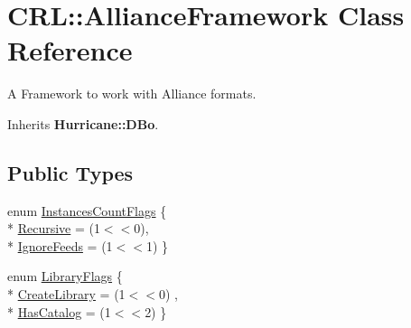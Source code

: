 \hypertarget{classCRL_1_1AllianceFramework}{\section{C\-R\-L\-:\-:Alliance\-Framework Class Reference}
\label{classCRL_1_1AllianceFramework}
}


A Framework to work with Alliance formats.  




Inherits {\bf Hurricane\-::\-D\-Bo}.

\subsection*{Public Types}
\begin{DoxyCompactItemize}
\item 
enum \hyperlink{classCRL_1_1AllianceFramework_a03ef94e043d2d25eb7a6a5f1ae176432}{Instances\-Count\-Flags} \{ \\*
\hyperlink{classCRL_1_1AllianceFramework_a03ef94e043d2d25eb7a6a5f1ae176432a3c65ebdaecc4b34b54a01ff3a5c3195a}{Recursive} = (1$<$$<$0), 
\\*
\hyperlink{classCRL_1_1AllianceFramework_a03ef94e043d2d25eb7a6a5f1ae176432a4a10630340ffb5b0aa9983f8b7f4cbe0}{Ignore\-Feeds} = (1$<$$<$1)
 \}
\item 
enum \hyperlink{classCRL_1_1AllianceFramework_a0ec1cd09dec34dfecfec22927b92cc25}{Library\-Flags} \{ \\*
\hyperlink{classCRL_1_1AllianceFramework_a0ec1cd09dec34dfecfec22927b92cc25ade58398b3ec849dc3aedb6a0812fbc7a}{Create\-Library} = (1$<$$<$0)
, \\*
\hyperlink{classCRL_1_1AllianceFramework_a0ec1cd09dec34dfecfec22927b92cc25a8d9678631764327cbfe81f8184fa9e05}{Has\-Catalog} = (1$<$$<$2)
 \}
\end{DoxyCompactItemize}
